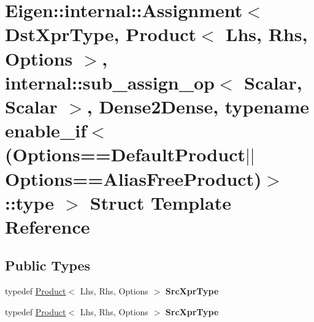 \hypertarget{struct_eigen_1_1internal_1_1_assignment_3_01_dst_xpr_type_00_01_product_3_01_lhs_00_01_rhs_00_01ed0bc91f79379e8268cc6b22ba7de0c6}{}\section{Eigen\+:\+:internal\+:\+:Assignment$<$ Dst\+Xpr\+Type, Product$<$ Lhs, Rhs, Options $>$, internal\+:\+:sub\+\_\+assign\+\_\+op$<$ Scalar, Scalar $>$, Dense2\+Dense, typename enable\+\_\+if$<$(Options==Default\+Product$\vert$$\vert$\+Options==Alias\+Free\+Product)$>$\+:\+:type $>$ Struct Template Reference}
\label{struct_eigen_1_1internal_1_1_assignment_3_01_dst_xpr_type_00_01_product_3_01_lhs_00_01_rhs_00_01ed0bc91f79379e8268cc6b22ba7de0c6}
\subsection*{Public Types}
\begin{DoxyCompactItemize}
\item 
\mbox{\label{struct_eigen_1_1internal_1_1_assignment_3_01_dst_xpr_type_00_01_product_3_01_lhs_00_01_rhs_00_01ed0bc91f79379e8268cc6b22ba7de0c6_aaa296ef17ca0ac8a53b602b94f2d69b2}} 
typedef \hyperlink{group___core___module_class_eigen_1_1_product}{Product}$<$ Lhs, Rhs, Options $>$ {\bfseries Src\+Xpr\+Type}
\item 
\mbox{\label{struct_eigen_1_1internal_1_1_assignment_3_01_dst_xpr_type_00_01_product_3_01_lhs_00_01_rhs_00_01ed0bc91f79379e8268cc6b22ba7de0c6_aaa296ef17ca0ac8a53b602b94f2d69b2}} 
typedef \hyperlink{group___core___module_class_eigen_1_1_product}{Product}$<$ Lhs, Rhs, Options $>$ {\bfseries Src\+Xpr\+Type}
\end{DoxyCompactItemize}
